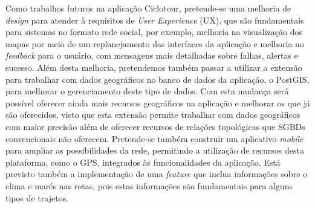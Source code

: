Como trabalhos futuros na aplicação Ciclotour, pretende-se uma melhoria de \textit{design} para atender à requisitos de \textit{User Experience} (UX), 
que são fundamentais para sistemas no formato rede social, por exemplo, melhoria na visualização dos mapas por meio de um replanejamento das 
interfaces da aplicação e melhoria no \textit{feedback} para o usuário, com mensagens mais detalhadas sobre falhas, alertas e sucesso. Além desta 
melhoria, pretendemos também passar a utilizar a extensão para trabalhar com dados geográficos no banco de dados da aplicação, o PostGIS, para 
melhorar o gerenciamento deste tipo de dados. Com esta mudança será possível oferecer ainda mais recursos geográficos na aplicação e melhorar os 
que já são oferecidos, visto que esta extensão permite trabalhar com dados geográficos com maior precisão além de oferecer recursos de relações 
topológicas que SGBDs convencionais não oferecem. Pretende-se também construir um aplicativo \textit{mobile} para ampliar as possibilidades da rede, 
permitindo a utilização de recursos desta plataforma, como o GPS, integrados às funcionalidades da aplicação. Está previsto também a implementação de 
uma \textit{feature} que inclua informações sobre o clima e marés nas rotas, pois estas informações são fundamentais para alguns tipos de trajetos.



